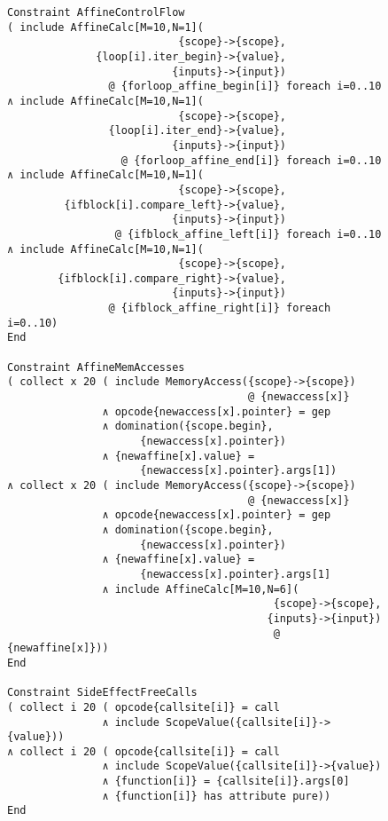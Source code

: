 \begin{figure}[p]
\begin{lstlisting}[language=CAnDL,basicstyle=\linespread{0.8}\ttfamily,
                   firstnumber=35]
Constraint AffineControlFlow
( include AffineCalc[M=10,N=1](
                           {scope}->{scope},
              {loop[i].iter_begin}->{value},
                          {inputs}->{input})
                @ {forloop_affine_begin[i]} foreach i=0..10
∧ include AffineCalc[M=10,N=1](
                           {scope}->{scope},
                {loop[i].iter_end}->{value},
                          {inputs}->{input})
                  @ {forloop_affine_end[i]} foreach i=0..10
∧ include AffineCalc[M=10,N=1](
                           {scope}->{scope},
         {ifblock[i].compare_left}->{value},
                          {inputs}->{input})
                 @ {ifblock_affine_left[i]} foreach i=0..10
∧ include AffineCalc[M=10,N=1](
                           {scope}->{scope},
        {ifblock[i].compare_right}->{value},
                          {inputs}->{input})
                @ {ifblock_affine_right[i]} foreach i=0..10)
End

Constraint AffineMemAccesses
( collect x 20 ( include MemoryAccess({scope}->{scope})
                                      @ {newaccess[x]}
               ∧ opcode{newaccess[x].pointer} = gep
               ∧ domination({scope.begin},
                     {newaccess[x].pointer})
               ∧ {newaffine[x].value} =
                     {newaccess[x].pointer}.args[1])
∧ collect x 20 ( include MemoryAccess({scope}->{scope})
                                      @ {newaccess[x]}
               ∧ opcode{newaccess[x].pointer} = gep
               ∧ domination({scope.begin},
                     {newaccess[x].pointer})
               ∧ {newaffine[x].value} =
                     {newaccess[x].pointer}.args[1]
               ∧ include AffineCalc[M=10,N=6](
                                          {scope}->{scope},
                                         {inputs}->{input})
                                          @ {newaffine[x]}))
End

Constraint SideEffectFreeCalls
( collect i 20 ( opcode{callsite[i]} = call
               ∧ include ScopeValue({callsite[i]}->{value}))
∧ collect i 20 ( opcode{callsite[i]} = call
               ∧ include ScopeValue({callsite[i]}->{value})
               ∧ {function[i]} = {callsite[i]}.args[0]
               ∧ {function[i]} has attribute pure))
End
\end{lstlisting}
\end{figure}
